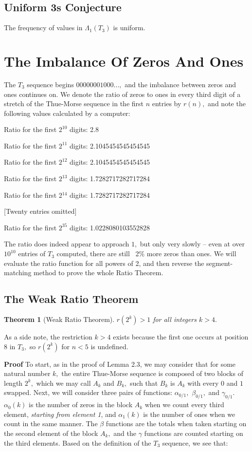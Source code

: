 \documentclass{article}
\newtheorem{theorem}{Theorem}[section]
\begin{document}
\subsection{Uniform 3s Conjecture}
The frequency of values in $\Lambda{_1(T_3)}$ is uniform.

\section{The Imbalance Of Zeros And Ones}

The $T_3$ sequence begins $00000001000...,$ and the imbalance between zeros and ones continues on. We denote the ratio of zeros to ones in every third digit of a stretch of the Thue-Morse sequence in the first $n$ entries by $r(n),$ and note the following values calculated by a computer:

Ratio for the first $2^{10}$ digits: 2.8

Ratio for the first $2^{11}$ digits: 2.1045454545454545

Ratio for the first $2^{12}$ digits: 2.1045454545454545

Ratio for the first $2^{13}$ digits: 1.7282717282717284

Ratio for the first 2$^{14}$ digits: 1.7282717282717284

[Twenty entries omitted]

Ratio for the first $2^{35}$ digits: 1.0228080103552828

The ratio does indeed appear to approach $1,$ but only very slowly -- even at over $10^{10}$ entries of $T_3$ computed, there are still ~2\% more zeros than ones. We will evaluate the ratio function for all powers of 2, and then reverse the segment-matching method to prove the whole Ratio Theorem.

\subsection{The Weak Ratio Theorem}

\begin{theorem}[Weak Ratio Theorem]
\label{wr}
$r(2^k) > 1$ for all integers $k > 4.$
\end{theorem}

As a side note, the restriction $k > 4$ exists because the first one occurs at position $8$ in $T_3,$ so $r(2^k)$ for $n < 5$ is undefined.

\textbf{Proof} To start, as in the proof of Lemma 2.3, we may consider that for some natural number $k,$ the entire Thue-Morse sequence is composed of two blocks of length $2^k,$ which we may call $A_k$ and $B_k,$ such that $B_k$ is $A_k$ with every $0$ and $1$ swapped. Next, we will consider three pairs of functions: $\alpha_{0/1},$ $\beta_{0/1},$ and $\gamma_{0/1}.$ $\alpha_0(k)$ is the number of zeros in the block $A_k$ when we count every third element, \emph{starting from element 1}, and $\alpha_1(k)$ is the number of ones when we count in the same manner. The $\beta$ functions are the totals when taken starting on the second element of the block $A_k,$ and the $\gamma$ functions are counted starting on the third elements. Based on the definition of the $T_3$ sequence, we see that:
\end{document}
